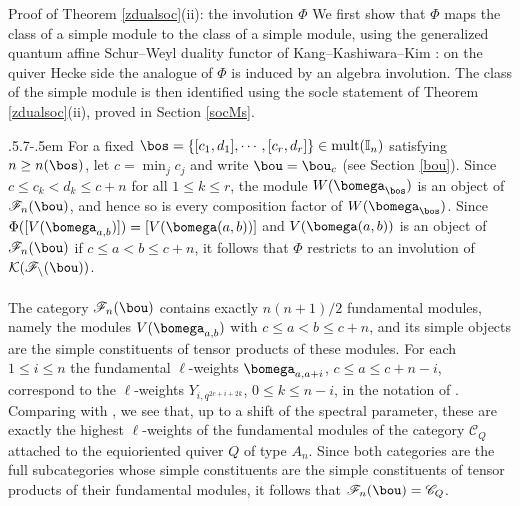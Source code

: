 \documentclass[11pt,reqno]{amsart}
\makeatletter
\theoremstyle{definition} \newtheorem*{defn}{Definition}
\theoremstyle{definition}
\numberwithin{equation}{section}
\def\section{\def\@secnumfont{\mdseries}\@startsection{section}{1}%
  \z@{.7\linespacing\@plus\linespacing}{.5\linespacing}%
  {\normalfont\scshape\centering}}
\def\subsection{\def\@secnumfont{\bfseries}\@startsection{subsection}{2}%
  {\parindent}{.5\linespacing\@plus.7\linespacing}{-.5em}%
  {\normalfont\bfseries}}
\makeatother
\begin{document}
\section{Proof of Theorem \ref{zdualsoc}(ii): the involution $\Phi$}\label{phi}
We first show that $\Phi$ maps the class of a simple module to the class of a simple module, using the generalized quantum affine Schur--Weyl duality functor of Kang--Kashiwara--Kim \cite{KKK15}: on the quiver Hecke side the analogue of $\Phi$ is induced by an algebra involution. The class of the simple module is then identified using the socle statement of Theorem \ref{zdualsoc}(ii), proved in Section \ref{socMs}.

\subsection{}\label{window} For a fixed $\bos = \{[c_1,d_1],\cdots, [c_r,d_r]\}\in{\rm mult}(\mathbb I_n)$
satisfying $n\ge n(\bos)$, let $c=\min_j c_j$ and write $\bou=\bou_c$ (see Section \ref{bou}). Since
$c\leq c_k<d_k\le c+n$ for all $1\leq k\leq r$, the module $W(\bomega_\bos)$ is an object of
$\mathscr F_n(\bou)$, and hence so is every composition factor of $W(\bomega_\bos)$. Since
$\Phi([V(\bomega_{a,b})])=[V(\bomega(a,b))]$ and $V(\bomega(a,b))$ is an object of $\mathscr F_n(\bou)$ if
$c\le a<b\le c+n$, it follows that $\Phi$ restricts to an involution of $\cal K(\mathscr F_n(\bou))$.
\\\\
The category $\mathscr F_n(\bou)$ contains exactly $n(n+1)/2$ fundamental modules, namely the modules
$V(\bomega_{a,b})$ with $c\le a<b\le c+n$, and its simple objects are the simple constituents of tensor
products of these modules. For each $1\le i\le n$ the fundamental $\ell$-weights $\bomega_{a,a+i}$,
$c\le a\le c+n-i$, correspond to the $\ell$-weights $Y_{i,q^{2c+i+2k}}$, $0\le k\le n-i$, in the
notation of \cite{FR99}. Comparing with \cite[Example 3.8, (3.3) and Remark 3.6]{HL15}, we see that,
up to a shift of the spectral parameter, these are exactly the highest $\ell$-weights of the
fundamental modules of the category $\mathscr C_Q$ attached to the equioriented quiver $Q$ of type
$A_n$. Since both categories are the full subcategories whose simple constituents are the simple
constituents of tensor products of their fundamental modules, it follows that
$\mathscr F_n(\bou)=\mathscr C_Q$.
\end{document}
